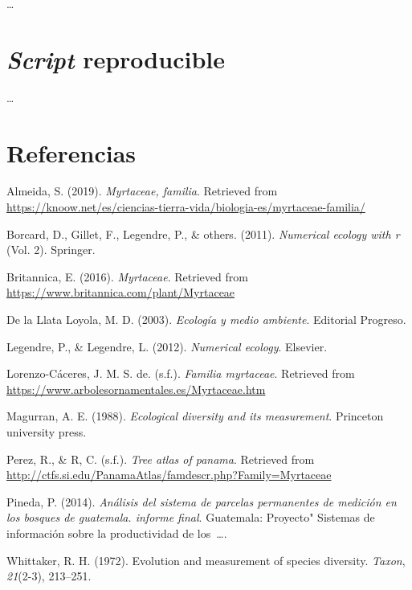 \documentclass[11pt,]{article}
\begin{document}
\ldots

\section{\texorpdfstring{\emph{Script}
reproducible}{Script reproducible}}\label{script-reproducible}

\ldots

\section*{Referencias}\label{referencias}

\hypertarget{refs}{}
\hypertarget{ref-sandra2019myrtaceae}{}
Almeida, S. (2019). \emph{Myrtaceae, familia}. Retrieved from
\url{https://knoow.net/es/ciencias-tierra-vida/biologia-es/myrtaceae-familia/}

\hypertarget{ref-borcard2011numerical}{}
Borcard, D., Gillet, F., Legendre, P., \& others. (2011).
\emph{Numerical ecology with r} (Vol. 2). Springer.

\hypertarget{ref-encymyrtaceae}{}
Britannica, E. (2016). \emph{Myrtaceae}. Retrieved from
\url{https://www.britannica.com/plant/Myrtaceae}

\hypertarget{ref-de2003ecologia}{}
De la Llata Loyola, M. D. (2003). \emph{Ecología y medio ambiente}.
Editorial Progreso.

\hypertarget{ref-legendre2012numerical}{}
Legendre, P., \& Legendre, L. (2012). \emph{Numerical ecology}.
Elsevier.

\hypertarget{ref-josemyrtaceae}{}
Lorenzo-Cáceres, J. M. S. de. (s.f.). \emph{Familia myrtaceae}.
Retrieved from \url{https://www.arbolesornamentales.es/Myrtaceae.htm}

\hypertarget{ref-magurran1988ecological}{}
Magurran, A. E. (1988). \emph{Ecological diversity and its measurement}.
Princeton university press.

\hypertarget{ref-pereztree}{}
Perez, R., \& R, C. (s.f.). \emph{Tree atlas of panama}. Retrieved from
\url{http://ctfs.si.edu/PanamaAtlas/famdescr.php?Family=Myrtaceae}

\hypertarget{ref-pineda2014analisis}{}
Pineda, P. (2014). \emph{Análisis del sistema de parcelas permanentes de
medición en los bosques de guatemala. informe final}. Guatemala:
Proyecto" Sistemas de información sobre la productividad de
los~\ldots{}.

\hypertarget{ref-whittaker1972evolution}{}
Whittaker, R. H. (1972). Evolution and measurement of species diversity.
\emph{Taxon}, \emph{21}(2-3), 213--251.




\newpage
\singlespacing 
\end{document}
